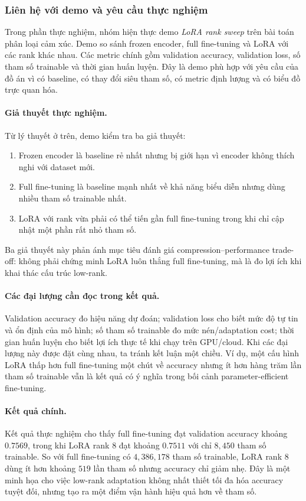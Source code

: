 \subsubsection{Liên hệ với demo và yêu cầu thực nghiệm}

Trong phần thực nghiệm, nhóm hiện thực demo \textit{LoRA rank sweep} trên bài toán phân
loại cảm xúc. Demo so sánh frozen encoder, full fine-tuning và LoRA với các rank khác
nhau. Các metric chính gồm validation accuracy, validation loss, số tham số trainable
và thời gian huấn luyện. Đây là demo phù hợp với yêu cầu của đồ án vì có baseline, có
thay đổi siêu tham số, có metric định lượng và có biểu đồ trực quan hóa.

\paragraph{Giả thuyết thực nghiệm.}
Từ lý thuyết ở trên, demo kiểm tra ba giả thuyết:
\begin{enumerate}[label=\textbf{H\arabic*.}, leftmargin=2em]
    \item Frozen encoder là baseline rẻ nhất nhưng bị giới hạn vì encoder không thích
    nghi với dataset mới.
    \item Full fine-tuning là baseline mạnh nhất về khả năng biểu diễn nhưng dùng nhiều
    tham số trainable nhất.
    \item LoRA với rank vừa phải có thể tiến gần full fine-tuning trong khi chỉ cập nhật
    một phần rất nhỏ tham số.
\end{enumerate}
Ba giả thuyết này phản ánh mục tiêu đánh giá compression--performance trade-off: không
phải chứng minh LoRA luôn thắng full fine-tuning, mà là đo lợi ích khi khai thác cấu
trúc low-rank.

\paragraph{Các đại lượng cần đọc trong kết quả.}
Validation accuracy đo hiệu năng dự đoán; validation loss cho biết mức độ tự tin và ổn
định của mô hình; số tham số trainable đo mức nén/adaptation cost; thời gian huấn luyện
cho biết lợi ích thực tế khi chạy trên GPU/cloud. Khi các đại lượng này được đặt cùng
nhau, ta tránh kết luận một chiều. Ví dụ, một cấu hình LoRA thấp hơn full fine-tuning
một chút về accuracy nhưng ít hơn hàng trăm lần tham số trainable vẫn là kết quả có ý
nghĩa trong bối cảnh parameter-efficient fine-tuning.

\paragraph{Kết quả chính.}
Kết quả thực nghiệm cho thấy full fine-tuning đạt validation accuracy khoảng
$0.7569$, trong khi LoRA rank $8$ đạt khoảng $0.7511$ với chỉ $8{,}450$ tham số
trainable. So với full fine-tuning có $4{,}386{,}178$ tham số trainable, LoRA rank $8$
dùng ít hơn khoảng $519$ lần tham số nhưng accuracy chỉ giảm nhẹ. Đây là một minh họa
cho việc low-rank adaptation không nhất thiết tối đa hóa accuracy tuyệt đối, nhưng tạo
ra một điểm vận hành hiệu quả hơn về tham số.

